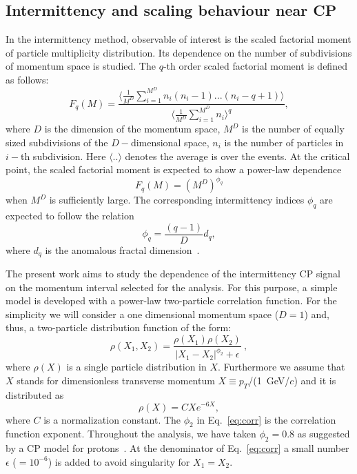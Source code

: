 \documentclass[floatfix,superscriptaddress,a4paper,
               nofootinbib,preprint]{revtex4}
\begin{document}
\subsection{Intermittency and scaling behaviour near CP}
\label{sec:intermittency}
In the intermittency method, observable of interest is the scaled factorial moment of particle multiplicity distribution. Its dependence on the number of subdivisions of momentum space is studied. 
The $q$-th order scaled factorial moment is defined as follows:
\begin{equation}
F_q (M) = \frac{ \langle \frac{1}{M^D} \sum_{i=1}^{M^D} n_i (n_i-1)...(n_i-q+1) \rangle }{ \langle \frac{1}{M^D} \sum_{i=1}^{M^D} n_i \rangle ^q },
\end{equation}
where $D$ is the dimension of the momentum space, $M^D$ is
the number of equally sized subdivisions of 
the $D-$dimensional space, $n_i$ is the number of particles in $i-$th subdivision. Here $\langle .. \rangle$ denotes the average is over the events.
At the critical point, the scaled factorial moment is expected to show a power-law dependence 
\begin{equation}
F_q (M) = (M^{D})^{\phi_q}
\end{equation}
when $M^D$ is sufficiently large.
The corresponding intermittency indices $\phi_q$ are expected
to follow the relation
\begin{equation}
 \phi_q = \frac{(q-1)}{D} d_q,
\end{equation}
where $d_q$ is the anomalous fractal dimension~\cite{DeWolf:1995nyp}.

The present work aims to study the dependence of the intermittency CP signal on the momentum interval selected for the analysis. For this purpose, a simple model is developed with a power-law two-particle correlation function.
For the simplicity we will consider 
a one dimensional momentum space ($D =1$)
and, thus, a two-particle distribution function of the form:
\begin{equation}\label{eq:corr}
 \rho(X_1,X_2) =  \frac{\rho({X_1}) \rho({X_2})}{ \left| X_1-X_2 \right| ^{\phi_2} + \epsilon}~,
\end{equation}
where $\rho(X)$ is a single particle distribution in $X$.
Furthermore we assume that
$X$ stands for dimensionless transverse momentum  $X \equiv p_T$/(1~GeV/$c$) and
it is distributed as
\begin{equation}\label{eq:rho}
 \rho(X) = C X e^{-6X},
\end{equation}
where $C$ is a normalization constant. 
The $\phi_2$ in Eq.~\ref{eq:corr} is the correlation function exponent. Throughout the analysis, we have taken $\phi_2 = 0.8$ as suggested by a CP model for protons~\cite{Antoniou:2006zb}.
At the denominator of Eq.~\ref{eq:corr} a small number $\epsilon$ ($= 10^{-6}$)
is added to avoid singularity for $X_1 = X_2$. 
\end{document}
